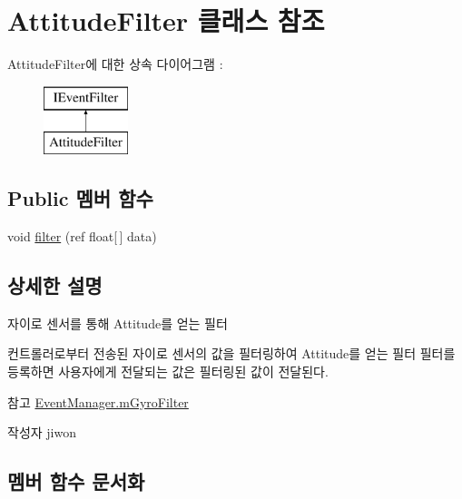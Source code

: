 \hypertarget{class_attitude_filter}{}\section{Attitude\+Filter 클래스 참조}
\label{class_attitude_filter}
Attitude\+Filter에 대한 상속 다이어그램 \+: \begin{figure}[H]
\begin{center}
\leavevmode
\includegraphics[height=2.000000cm]{class_attitude_filter}
\end{center}
\end{figure}
\subsection*{Public 멤버 함수}
\begin{DoxyCompactItemize}
\item 
void \hyperlink{class_attitude_filter_a91c49319cb969aae2a5b28948eeac963}{filter} (ref float\mbox{[}$\,$\mbox{]} data)
\end{DoxyCompactItemize}


\subsection{상세한 설명}
자이로 센서를 통해 Attitude를 얻는 필터

컨트롤러로부터 전송된 자이로 센서의 값을 필터링하여 Attitude를 얻는 필터 필터를 등록하면 사용자에게 전달되는 값은 필터링된 값이 전달된다. \begin{DoxySeeAlso}{참고}
\hyperlink{class_event_manager_a7cee85488f5d7220c102cd945b1f494a}{Event\+Manager.\+m\+Gyro\+Filter} 
\end{DoxySeeAlso}
\begin{DoxyAuthor}{작성자}
jiwon 
\end{DoxyAuthor}


\subsection{멤버 함수 문서화}
\hypertarget{class_attitude_filter_a91c49319cb969aae2a5b28948eeac963}{}
